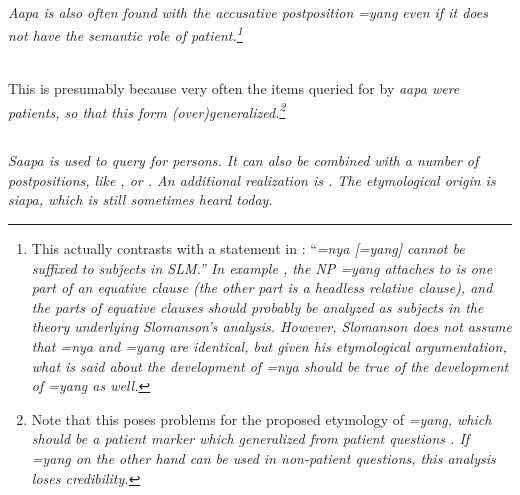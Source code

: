 


 \\
\em Aapa \em is also often found with the accusative postposition \em =yang \em even if it does not have the semantic role of patient.\footnote{This actually contrasts with a statement in \citep[cf.][150]{Slomanson2007cll}: ``\em =nya \em [=\em yang\em] cannot be suffixed to subjects in SLM.''  In example , the NP \em =yang \em attaches to is one part of an equative clause (the other part is a headless relative clause), and the parts of equative clauses should probably be analyzed as subjects in the theory underlying Slomanson's analysis. However, Slomanson does not assume that \em =nya \em and \em =yang \em are identical, but given his etymological argumentation, what is said about the development of \em =nya \em should be true of the development of \em =yang \em as well.}

\\

This is presumably because very often the items queried for by \em aapa \em were patients, so that this form (over)generalized.\footnote{Note that this poses problems for the proposed etymology of \em =yang\em, which should be a patient marker which generalized from patient questions \citep{Slomanson}. If \em =yang \em on the other hand can be used in non-patient questions, this analysis loses credibility.}


\subsection{}\label{sec:wc:saapa}
\em Saapa \em is used to query for persons. It can also be combined with a number of postpositions, like ,  or  . An additional realization is . The etymological origin is \em*siapa\em\src, which is still sometimes heard today.

